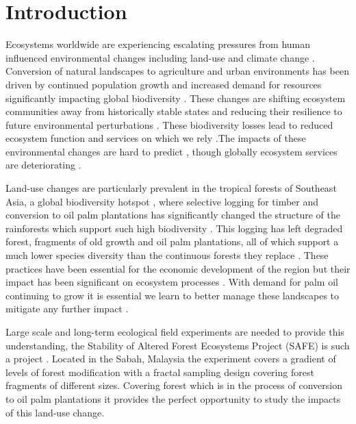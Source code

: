 
\section{Introduction}

Ecosystems worldwide are experiencing escalating pressures from human influenced environmental changes including land-use and climate change \citep{Hautier2015}. Conversion of natural landscapes to agriculture and urban environments has been driven by continued population growth and increased demand for resources \citep{Foley2005, Green2005} significantly impacting global biodiversity \citep{Pimm1995}. These changes are shifting ecosystem communities away from historically stable states \citep{Hautier2015} and reducing their resilience to future environmental perturbations \citep{Oliver2015}. These biodiversity losses lead to reduced ecosystem function and services on which we rely \citep{MillenniumEcosystemAssessment2005, Diaz2006}.The impacts of these environmental changes are hard to predict \citep{Carpenter2009}, though globally ecosystem services are deteriorating \citep{Mace2012}.

Land-use changes are particularly prevalent in the tropical forests of Southeast Asia, a global biodiversity hotspot \citep{DeBruyn2014},  where selective logging for timber and conversion to oil palm plantations has significantly changed the structure of the rainforests which support such high biodiversity \citep{Gibson2011}. This logging has left degraded forest, fragments of old growth and oil palm plantations, all of which support a much lower species diversity than the continuous forests they replace \citep{Fitzherbert2008, Haddad2015} . These practices have been essential for the economic development of the region \citep{Basiron2007} but their impact has been significant on ecosystem processes \citep{Koh2011, Schleuning2011, Ewers2015}.  With demand for palm oil continuing to grow it is essential we learn to better manage these landscapes to mitigate any further impact \citep{Turner2008}.

Large scale and long-term ecological field experiments are needed to provide this understanding, the Stability of Altered Forest Ecosystems Project (SAFE) is such a project \citep{Ewers2011}. Located in the Sabah, Malaysia the experiment covers a gradient of levels of forest modification with a fractal sampling design covering forest fragments of different sizes. Covering forest which is in the process of conversion to oil palm plantations it provides the perfect opportunity to study the impacts of this land-use change.

